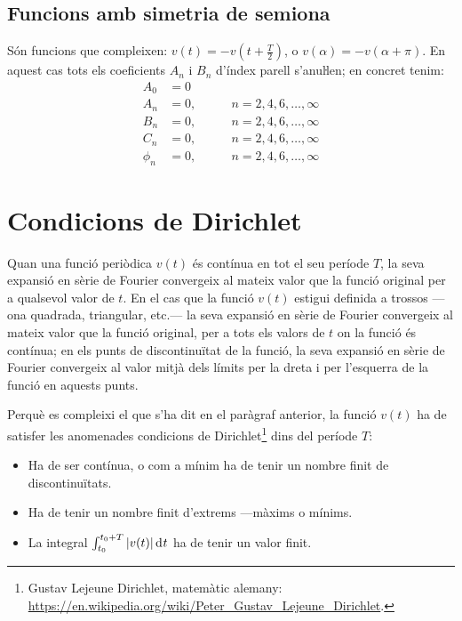 \subsection{Funcions amb simetria de semiona}

Són funcions que compleixen: $v(t) = -v(t+\frac{T}{2})$, o $v(\alpha) = -v(\alpha+\pi)$. En aquest
cas tots els coeficients $A_n$ i $B_n$ d'índex parell s'anuŀlen;
en concret tenim:
\begin{subequations}
\begin{alignat}{2}
    A_0 &= 0       & \\[0.5ex]
    A_n &= 0,       &\qquad n = 2,4,6,\ldots,\infty\\[0.5ex]
    B_n &= 0,      &\qquad n = 2,4,6,\ldots,\infty\\[0.5ex]
    C_n &= 0,       &\qquad n = 2,4,6,\ldots,\infty\\[0.5ex]
    \phi_n &= 0, &\qquad n = 2,4,6,\ldots,\infty
\end{alignat}
\end{subequations}

\section{Condicions de Dirichlet}\label{sec:dirichlet}

Quan una funció periòdica $v(t)$  és contínua en tot el seu període
$T$, la seva expansió en sèrie de Fourier convergeix al mateix valor
que la funció original per a qualsevol valor de $t$.
En el cas que la funció $v(t)$ estigui definida a trossos ---ona quadrada, triangular, etc.--- la seva expansió en sèrie de Fourier convergeix al mateix valor que
la funció original, per a tots els valors de $t$ on la funció és
contínua;  en els punts de discontinuïtat de la funció, la seva
expansió en sèrie de Fourier convergeix al valor mitjà dels límits
per la dreta i per l'esquerra de la funció en aquests punts. 

Perquè es compleixi el que s'ha dit en el paràgraf anterior, la funció $v(t)$ ha de satisfer les anomenades
condicions de Dirichlet\footnote{Gustav Lejeune Dirichlet, matemàtic alemany: \href{https://en.wikipedia.org/wiki/Peter_Gustav_Lejeune_Dirichlet}{https:/\!\!/en.wikipedia.org/wiki/Peter\_Gustav\_Lejeune\_Dirichlet}.} dins del període $T$:
\begin{itemize}
   \item Ha de ser contínua, o com a mínim ha de tenir un nombre finit de discontinuïtats.
   \item Ha de tenir un nombre finit d'extrems ---màxims o mínims.
   \item La integral $\int_{t_0}^{t_0+T} |v(t)| \diff t$ ha de tenir un valor finit.
\end{itemize}

